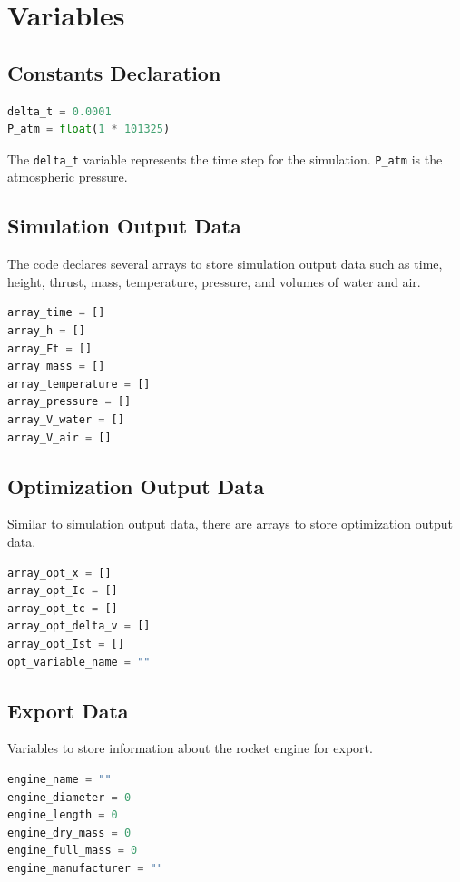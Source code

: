 \documentclass{report}
\begin{document}
\chapter{Variables}

\section{Constants Declaration}
 
\begin{lstlisting}[language=Python]
delta_t = 0.0001
P_atm = float(1 * 101325)
\end{lstlisting}
The \texttt{delta\_t} variable represents the time step for the simulation. \texttt{P\_atm} is the atmospheric pressure.

\section{Simulation Output Data}

The code declares several arrays to store simulation output data such as time, height, thrust, mass, temperature, pressure, and volumes of water and air.

\begin{lstlisting}[language=Python]
array_time = []
array_h = []
array_Ft = []
array_mass = []
array_temperature = []
array_pressure = []
array_V_water = []
array_V_air = []
\end{lstlisting}

\section{Optimization Output Data}

Similar to simulation output data, there are arrays to store optimization output data.

\begin{lstlisting}[language=Python]
array_opt_x = []
array_opt_Ic = []
array_opt_tc = []
array_opt_delta_v = []
array_opt_Ist = []
opt_variable_name = ""
\end{lstlisting}

\section{Export Data}

Variables to store information about the rocket engine for export.

\begin{lstlisting}[language=Python]
engine_name = ""
engine_diameter = 0
engine_length = 0
engine_dry_mass = 0
engine_full_mass = 0
engine_manufacturer = ""
\end{lstlisting}
\end{document}
